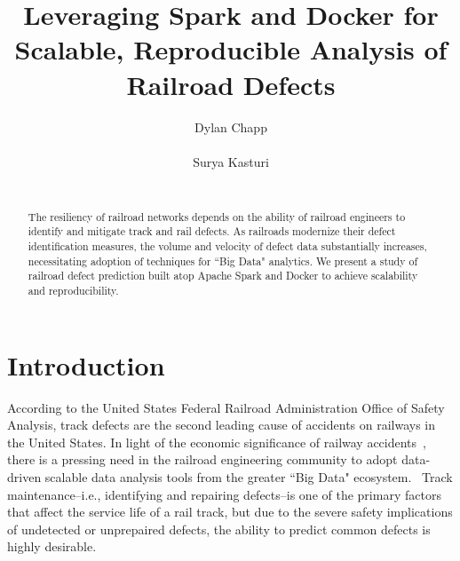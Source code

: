 \documentclass{sig-alternate-05-2015}
\begin{document}





%

\title{Leveraging Spark and Docker for Scalable, Reproducible Analysis of Railroad Defects}

\author{
\alignauthor
Dylan Chapp\\
       \\
\alignauthor
Surya Kasturi\\
       \\
}

\maketitle
\begin{abstract}
The resiliency of railroad networks depends on the ability of railroad 
engineers to identify and mitigate track and rail defects. As railroads
modernize their defect identification measures, the volume and velocity of 
defect data substantially increases, necessitating adoption of techniques
for ``Big Data" analytics. We present a study of railroad defect prediction 
built atop Apache Spark and Docker to achieve scalability and reproducibility.
\end{abstract}

\section{Introduction}
According to the United States Federal Railroad Administration Office of Safety Analysis, track defects are the second leading cause of accidents on railways in the United States.
In light of the economic significance of railway accidents~\cite{Schafer:08}, there is a pressing need in the railroad engineering community to adopt data-driven scalable data analysis tools from the greater ``Big Data" ecosystem.~\cite{Zarembski:14} 
Track maintenance--i.e., identifying and repairing defects--is one of the primary factors that affect the service life of a rail track, but due to the severe safety implications of undetected or unprepaired defects, the ability to predict common defects is highly desirable. 
\end{document}
